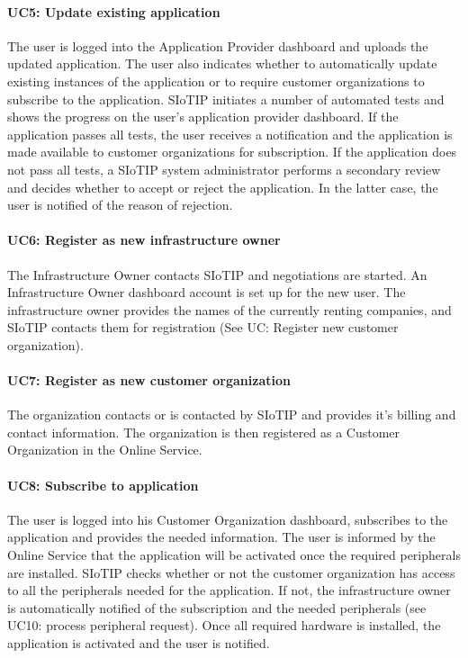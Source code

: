 \documentclass[english,peerreview]{sareport}
\begin{document}
\paragraph{UC5: Update existing application}
The user is logged into the Application Provider dashboard and uploads the updated application. The user also indicates whether to automatically update existing instances of the application or to require customer organizations to subscribe to the application. SIoTIP initiates a number of automated tests and shows the progress on the user's application provider dashboard. If the application passes all tests, the user receives a notification and the application is made available to customer organizations for subscription. If the application does not pass all tests, a SIoTIP system administrator performs a secondary review and decides whether to accept or reject the application. In the latter case, the user is notified of the reason of rejection.

\paragraph{UC6: Register as new infrastructure owner}
The Infrastructure Owner contacts SIoTIP and negotiations are started. An Infrastructure Owner dashboard account is set up for the new user. The infrastructure owner provides the names of the currently renting companies, and SIoTIP contacts them for registration (See UC: Register new customer organization).

\paragraph{UC7: Register as new customer organization}
The organization contacts or is contacted by SIoTIP and provides it's billing and contact information. The organization is then registered as a Customer Organization in the Online Service.

\paragraph{UC8: Subscribe to application}
The user is logged into his Customer Organization dashboard, subscribes to the application and provides the needed information. The user is informed by the Online Service that the application will be activated once the required peripherals are installed. SIoTIP checks whether or not the customer organization has access to all the peripherals needed for the application. If not, the infrastructure owner is automatically notified of the subscription and the needed peripherals (see UC10: process peripheral request). Once all required hardware is installed, the application is activated and the user is notified.
\end{document}
